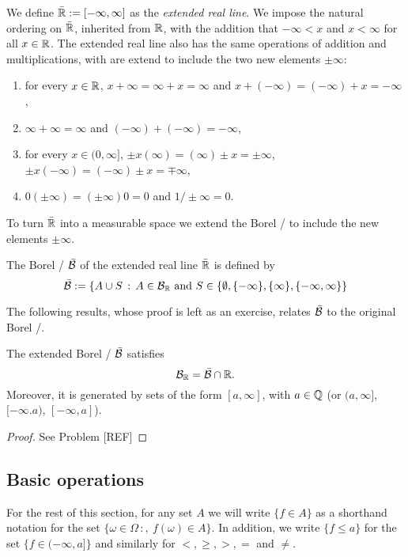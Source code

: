 We define $\bar{\mathbb R} := [-\infty, \infty]$ as the \emph{extended real line}. We impose the natural ordering on $\bar{\mathbb R}$, inherited from $\mathbb R$, with the addition that $-\infty < x$ and $x < \infty$ for all $x \in \mathbb R$. The extended real line also has the same operations of addition and multiplications, with are extend to include the two new elements $\pm \infty$:
\begin{enumerate}
\item for every $x\in \mathbb R$, $x + \infty = \infty + x = \infty$ and $x + (-\infty) = (-\infty) + x = -\infty$,
\item $\infty + \infty = \infty$ and $(-\infty) + (-\infty) = -\infty$,
\item for every $x \in (0,\infty]$, $\pm x (\infty) = (\infty) \pm x = \pm \infty$, $\pm x (-\infty) = (-\infty) \pm x = \mp \infty$,
\item $0 (\pm \infty) = (\pm \infty) 0 = 0$ and $1/\pm \infty = 0$.
\end{enumerate}

To turn $\bar{\mathbb R}$ into a measurable space we extend the Borel \sigalg/ to include the new elements $\pm \infty$.

\begin{definition}
The Borel \sigalg/ $\bar{\mathcal B}$ of the extended real line $\bar{\mathbb R}$ is defined by
\[
	\bar{\mathcal B} := \{A \cup S \, :\, A \in \mathcal B_{\mathbb R} \text{ and } S \in \{\emptyset, \{-\infty\}, \{\infty\}, \{-\infty, \infty\}\}
\]
\end{definition}

The following results, whose proof is left as an exercise, relates $\bar{\mathcal B}$ to the original Borel \sigalg/.

\begin{lemma}\label{lem:characterization_extended_borel}
The extended Borel \sigalg/ $\bar{\mathcal B}$ satisfies
\[
	\mathcal B_{\mathbb R} = \bar{\mathcal B} \cap \mathbb R.
\]
Moreover, it is generated by sets of the form $[a,\infty]$, with $a \in \mathbb Q$ (or $(a,\infty]$, $[-\infty.a)$, $[-\infty,a]$).
\end{lemma}

\begin{proof}
See Problem [REF]
\end{proof}

\subsection{Basic operations}

For the rest of this section, for any set $A$ we will write $\{f \in A\}$ as a shorthand notation for the set $\{\omega \in \Omega \, :,\ f(\omega) \in A\}$. In addition, we write $\{f \le a\}$ for the set $\{f \in (-\infty, a]\}$ and similarly for $<, \ge, >, =$ and $\ne$.


